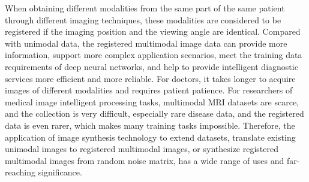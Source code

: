 \documentclass{ecai}
\begin{document}
When obtaining different modalities from the same part of the same patient through different imaging techniques, these modalities are considered to be registered if the imaging position and the viewing angle are identical. Compared with unimodal data, the registered multimodal image data can provide more information, support more complex application scenarios, meet the training data requirements of deep neural networks, and help to provide intelligent diagnostic services more efficient and more reliable. For doctors, it takes longer to acquire images of different modalities and requires patient patience. For researchers of medical image intelligent processing tasks, multimodal MRI datasets are scarce, and the collection is very difficult, especially rare disease data, and the registered data is even rarer, which makes many training tasks impossible. Therefore, the application of image synthesis technology to extend datasets, translate existing unimodal images to registered multimodal images, or synthesize registered multimodal images from random noise matrix, has a wide range of uses and far-reaching significance.
\end{document}
